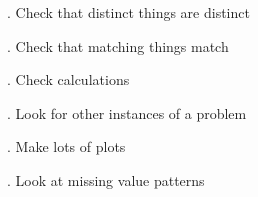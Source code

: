 \documentclass[aspectratio=169,12pt,t]{beamer}
\begin{document}
\begin{frame}{}

\vspace{-15mm} \hspace{0.4\textwidth}
{. Check that distinct things are distinct}

\note{
}
\end{frame}


\begin{frame}{}

\vspace{-15mm} \hspace{0.4\textwidth}
{. Check that matching things match}

\note{
}
\end{frame}



\begin{frame}{}

\vspace{-15mm} \hspace{0.4\textwidth}
{. Check calculations}

\note{
}
\end{frame}



\begin{frame}{}

\centering
\Large

\bigskip \bigskip \bigskip

{. Look for other instances of a problem}

\note{
}
\end{frame}



\begin{frame}{}

\vspace{-15mm} \hspace{0.4\textwidth}
{. Make lots of plots}

\note{
}
\end{frame}


\begin{frame}{}

\vspace{-15mm} \hspace{0.4\textwidth}
{. Look at missing value patterns}

\note{
}
\end{frame}
\end{document}
